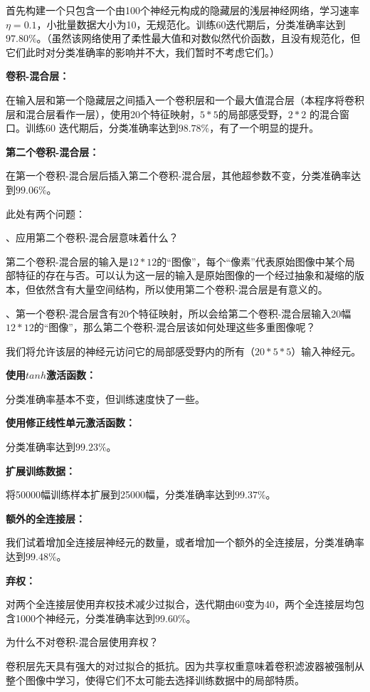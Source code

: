 \documentclass[a4paper, 11pt]{article}
\begin{document}
\begin{CJK*}{GBK}{song}
\quad\quad
首先构建一个只包含一个由100个神经元构成的隐藏层的浅层神经网络，学习速率$\eta=0.1$，小批量数据大小为10，无规范化。训练60迭代期后，分类准确率达到$97.80\%$。（虽然该网络使用了柔性最大值和对数似然代价函数，且没有规范化，但它们此时对分类准确率的影响并不大，我们暂时不考虑它们。）

{\bf 卷积-混合层：}

\quad\quad
在输入层和第一个隐藏层之间插入一个卷积层和一个最大值混合层（本程序将卷积层和混合层看作一层），使用20个特征映射，$5*5$的局部感受野，$2*2$ 的混合窗口。训练60 迭代期后，分类准确率达到$98.78\%$，有了一个明显的提升。

{\bf 第二个卷积-混合层：}

\quad\quad
在第一个卷积-混合层后插入第二个卷积-混合层，其他超参数不变，分类准确率达到$99.06\%$。

\quad\quad
此处有两个问题：

\quad{}、应用第二个卷积-混合层意味着什么？

\quad\quad
第二个卷积-混合层的输入是$12*12$的“图像”，每个“像素”代表原始图像中某个局部特征的存在与否。可以认为这一层的输入是原始图像的一个经过抽象和凝缩的版本，但依然含有大量空间结构，所以使用第二个卷积-混合层是有意义的。

\quad{}、第一个卷积-混合层含有20个特征映射，所以会给第二个卷积-混合层输入20幅$12*12$的“图像”，那么第二个卷积-混合层该如何处理这些多重图像呢？

\quad\quad
我们将允许该层的神经元访问它的局部感受野内的所有（$20*5*5$）输入神经元。

{\bf 使用$tanh$激活函数：}

\quad\quad
分类准确率基本不变，但训练速度快了一些。

{\bf 使用修正线性单元激活函数：}

\quad\quad
分类准确率达到$99.23\%$。

{\bf 扩展训练数据：}

\quad\quad
将50000幅训练样本扩展到25000幅，分类准确率达到$99.37\%$。

{\bf 额外的全连接层：}

\quad\quad
我们试着增加全连接层神经元的数量，或者增加一个额外的全连接层，分类准确率达到$99.48\%$。

{\bf 弃权：}

\quad\quad
对两个全连接层使用弃权技术减少过拟合，迭代期由60变为40，两个全连接层均包含1000个神经元，分类准确率达到$99.60\%$。

\quad\quad
为什么不对卷积-混合层使用弃权？

\quad\quad
卷积层先天具有强大的对过拟合的抵抗。因为共享权重意味着卷积滤波器被强制从整个图像中学习，使得它们不太可能去选择训练数据中的局部特质。


\end{CJK*}
\end{document}
